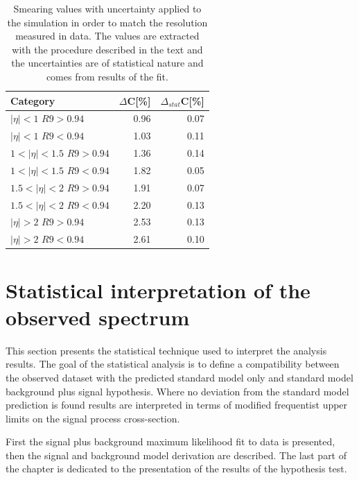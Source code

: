 \begin{table}[!h]
 \begin{center}
   \begin{tabular}{|l|r|r|}
     \hline
     Category                   & $\Delta$C[\%] & $\Delta_{stat}$C[\%] \\ \hline
 $|\eta| < 1$ $R9 > 0.94$       & 0.96          & 0.07 \\
 $|\eta| < 1$ $R9 < 0.94$       & 1.03          & 0.11 \\
 $1 < |\eta| < 1.5$ $R9 > 0.94$ & 1.36          & 0.14 \\
 $1 < |\eta| < 1.5$ $R9 < 0.94$ & 1.82          & 0.05 \\
 $1.5 < |\eta| < 2$ $R9 > 0.94$ & 1.91          & 0.07 \\
 $1.5 < |\eta| < 2$ $R9 < 0.94$ & 2.20          & 0.13 \\
 $|\eta| > 2$ $R9 > 0.94$       & 2.53          & 0.13 \\
 $|\eta| > 2$ $R9 < 0.94$       & 2.61          & 0.10 \\
   \hline
   \end{tabular}
   \caption{Smearing values with uncertainty applied to the simulation in order to match the resolution measured in data.
     The values are extracted with the procedure described in the text and the uncertainties are of statistical nature
     and comes from results of the fit.}
    \label{tab:esmear_2016}
  \end{center}
\end{table}

\clearpage
\section{Statistical interpretation of the observed \mgg spectrum}
\label{sec:results}

This section presents the statistical technique used to interpret the analysis results.
The goal of the statistical analysis is to define a compatibility between the observed dataset
with the predicted standard model only and standard model background plus signal hypothesis.
Where no deviation from the standard model prediction is found results are interpreted in terms
of modified frequentist upper limits on the signal process cross-section.

First the signal plus background maximum likelihood fit to data is presented, then the signal and
background model derivation are described. The last part of the chapter is dedicated to the presentation of
the results of the hypothesis test.


